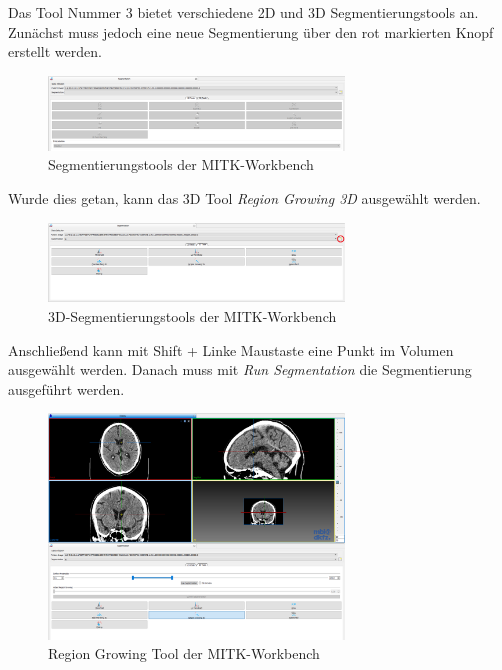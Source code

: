 Das Tool Nummer 3  bietet verschiedene 2D und 3D Segmentierungstools an. Zunächst muss jedoch eine neue Segmentierung über den rot markierten Knopf erstellt werden.

\begin{figure}[H]
\centering 
\includegraphics[width=0.7\textwidth]{Logos/MITK_Doku/5.PNG}
\caption{Segmentierungstools der MITK-Workbench} 
\label{fig:fuenf} 
\end{figure}

Wurde dies getan, kann das 3D Tool \textit{Region Growing 3D} ausgewählt werden.

\begin{figure}[H] 
\centering 
\includegraphics[width=0.7\textwidth]{Logos/MITK_Doku/6.PNG}
\caption{3D-Segmentierungstools  der MITK-Workbench} 
\label{fig:sechs} 
\end{figure}

Anschließend kann mit Shift + Linke Maustaste eine Punkt im Volumen ausgewählt werden. Danach muss mit  \textit{Run Segmentation} die Segmentierung ausgeführt werden.

\begin{figure}[H] 
\centering 
\includegraphics[width=0.7\textwidth]{Logos/MITK_Doku/7.PNG}
\caption{Region Growing Tool der MITK-Workbench} 
\label{fig:sieben} 
\end{figure}

